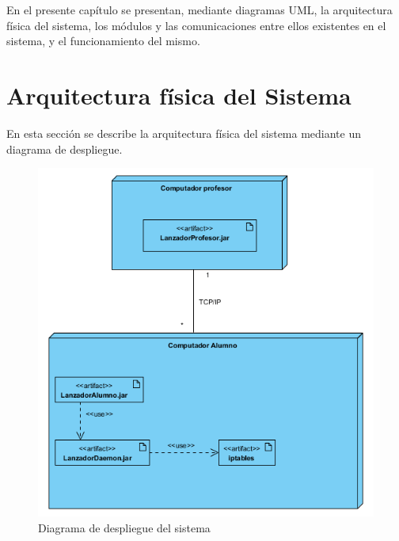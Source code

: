 

\label{chap:arquitectura}

En el presente capítulo se presentan, mediante diagramas UML, la arquitectura física del sistema, los módulos y las comunicaciones entre ellos existentes en el sistema, y el funcionamiento del mismo.


\chaptertoc

\section{Arquitectura física del Sistema}
\label{sec:arquitectura:arqFisica}

En esta sección se describe la arquitectura física del sistema mediante un diagrama de despliegue.
\begin{figure}
    \centering
    \includegraphics[width=.75\linewidth]{arquitectura/despliegueSistema}
    \caption{Diagrama de despliegue del sistema}
    \label{fig:arquitectura:despliegueSistema}
\end{figure}
\newline


